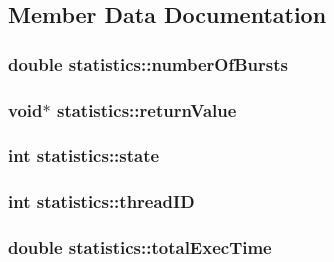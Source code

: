 \subsection{Member Data Documentation}
\hypertarget{structstatistics_a8e8a0ef64766f7b89b16d6670b3e2c13}{
\subsubsection[{number\+Of\+Bursts}]{\setlength{\rightskip}{0pt plus 5cm}double statistics\+::number\+Of\+Bursts}}\label{structstatistics_a8e8a0ef64766f7b89b16d6670b3e2c13}
\hypertarget{structstatistics_a26498872dfc8b8f14c9979b6a120d143}{
\subsubsection[{return\+Value}]{\setlength{\rightskip}{0pt plus 5cm}void$\ast$ statistics\+::return\+Value}}\label{structstatistics_a26498872dfc8b8f14c9979b6a120d143}
\hypertarget{structstatistics_a9d202292a83d65bf5f21c3f39ceb79a0}{
\subsubsection[{state}]{\setlength{\rightskip}{0pt plus 5cm}int statistics\+::state}}\label{structstatistics_a9d202292a83d65bf5f21c3f39ceb79a0}
\hypertarget{structstatistics_a5c48986d000837a81f031d7e5bf67493}{
\subsubsection[{thread\+I\+D}]{\setlength{\rightskip}{0pt plus 5cm}int statistics\+::thread\+I\+D}}\label{structstatistics_a5c48986d000837a81f031d7e5bf67493}
\hypertarget{structstatistics_a8874aa4d398b5f67d6c829100b9bf97a}{
\subsubsection[{total\+Exec\+Time}]{\setlength{\rightskip}{0pt plus 5cm}double statistics\+::total\+Exec\+Time}}\label{structstatistics_a8874aa4d398b5f67d6c829100b9bf97a}
